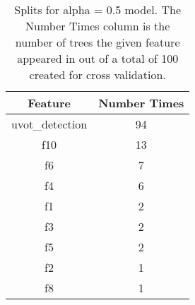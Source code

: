 \begin{table}[H]
\begin{center}
\begin{tabular}{cc}
  \hline
Feature & Number Times \\ 
  \hline
uvot\_detection & 94 \\ 
  f10 & 13 \\ 
  f6 & 7 \\ 
  f4 & 6 \\ 
  f1 & 2 \\ 
  f3 & 2 \\ 
  f5 & 2 \\ 
  f2 & 1 \\ 
  f8 & 1 \\ 
   \hline
\end{tabular}
\caption{Splits for alpha = 0.5 model. The Number Times column is the number of trees the given feature appeared in out of a total of 100 created for cross validation.}
\end{center}
\end{table}
